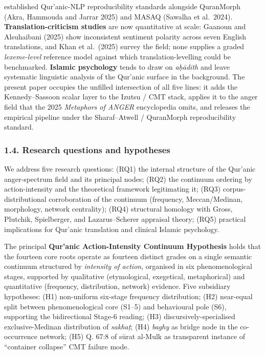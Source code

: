 established Qur'anic-NLP reproducibility standards alongside QuranMorph
(Akra, Hammouda and Jarrar 2025) and MASAQ (Sawalha et al.~2024).
\textbf{Translation-criticism studies} are now quantitative at scale:
Gaanoun and Alsuhaibani (2025) show inconsistent sentiment polarity
across seven English translations, and Khan et al.~(2025) survey the
field; none supplies a graded \emph{lexeme-level} reference model
against which translation-levelling could be benchmarked.
\textbf{Islamic psychology} tends to draw on \emph{aḥādīth} and leave
systematic linguistic analysis of the Qur'anic surface in the
background. The present paper occupies the unfilled intersection of all
five lines: it adds the Kennedy--Sassoon scalar layer to the Izutsu /
CMT stack, applies it to the anger field that the 2025 \emph{Metaphors
of ANGER} encyclopedia omits, and releases the empirical pipeline under
the Sharaf--Atwell / QuranMorph reproducibility standard.

\subsubsection{1.4. Research questions and
hypotheses}\label{research-questions-and-hypotheses}

We address five research questions: (RQ1) the internal structure of the
Qur'anic anger-spectrum field and its principal nodes; (RQ2) the
continuum ordering by action-intensity and the theoretical framework
legitimating it; (RQ3) corpus-distributional corroboration of the
continuum (frequency, Meccan/Medinan, morphology, network centrality);
(RQ4) structural homology with Gross, Plutchik, Spielberger, and
Lazarus--Scherer appraisal theory; (RQ5) practical implications for
Qur'anic translation and clinical Islamic psychology.

The principal \textbf{Qur'anic Action-Intensity Continuum Hypothesis}
holds that the fourteen core roots operate as fourteen distinct grades
on a single semantic continuum structured by \emph{intensity of action},
organised in six phenomenological stages, supported by qualitative
(etymological, exegetical, metaphorical) and quantitative (frequency,
distribution, network) evidence. Five subsidiary hypotheses: (H1)
non-uniform six-stage frequency distribution; (H2) near-equal split
between phenomenological core (S1--5) and behavioural pole (S6),
supporting the bidirectional Stage-6 reading; (H3)
discursively-specialised exclusive-Medinan distribution of
\emph{sakhaṭ}; (H4) \emph{baghy} as bridge node in the co-occurrence
network; (H5) Q. 67:8 of sūrat al-Mulk as transparent instance of
``container collapse'' CMT failure mode.

